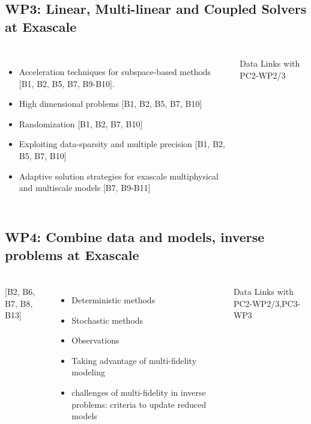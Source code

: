 \subsection{WP3: Linear, Multi-linear and Coupled Solvers at Exascale}
\begin{frame}
  \frametitle{\insertsectionhead}
  \framesubtitle{\insertsubsectionhead}
  \begin{columns}
    \begin{itemize}
      \item Acceleration techniques for subspace-based methods [B1, B2, B5, B7, B9-B10].
      \item High dimensional problems [B1, B2, B5, B7, B10] 
      \item Randomization [B1, B2, B7, B10]
      \item Exploiting data-sparsity and multiple precision [B1, B2, B5, B7, B10]
      \item Adaptive solution strategies for exascale multiphysical and multiscale models [B7, B9-B11] 
    \end{itemize}

    \begin{alertblock}{Data}
    Links with PC2-WP2/3   
  \end{alertblock}
  \end{columns}

\end{frame}

\subsection{WP4: Combine data and models, inverse problems at Exascale }
\begin{frame}
  \frametitle{\insertsectionhead}
  \framesubtitle{\insertsubsectionhead}
  \begin{columns}
    [B2, B6, B7, B8, B13]
    \begin{itemize}
      \item Deterministic methods
      \item Stochastic methods
      \item Observations
      \item Taking advantage of multi-fidelity modeling
      \item challenges of multi-fidelity in inverse problems: criteria to update reduced models
    \end{itemize}
    \begin{alertblock}{Data}
    Links with PC2-WP2/3,PC3-WP3
  \end{alertblock}
  \end{columns}
\end{frame}

